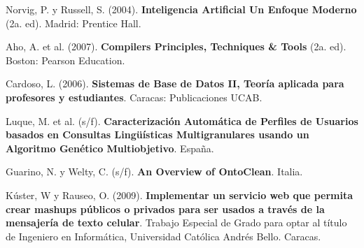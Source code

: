 \begin{thebibliography}{20}
     Norvig, P. y Russell, S. (2004). \textbf{Inteligencia Artificial Un Enfoque Moderno} (2a. ed). Madrid: Prentice Hall.

     Aho, A. et al. (2007). \textbf{Compilers Principles, Techniques & Tools} (2a. ed). Boston: Pearson Education.

     Cardoso, L. (2006). \textbf{Sistemas de Base de Datos II, Teoría aplicada para profesores y estudiantes}. Caracas: Publicaciones UCAB.

     Luque, M. et al. (s/f). \textbf{Caracterización Automática de Perfiles de Usuarios basados en Consultas Lingüísticas Multigranulares usando un Algoritmo Genético Multiobjetivo}. España.

 Guarino, N. y Welty, C. (s/f). \textbf{An Overview of OntoClean}. Italia.

 Kúster, W y Rauseo, O. (2009). \textbf{Implementar un servicio web que permita crear mashups públicos o privados para ser usados a través de la mensajería de texto celular}. Trabajo Especial de Grado para optar al título de Ingeniero en Informática, Universidad Católica Andrés Bello. Caracas.

\end{thebibliography}
